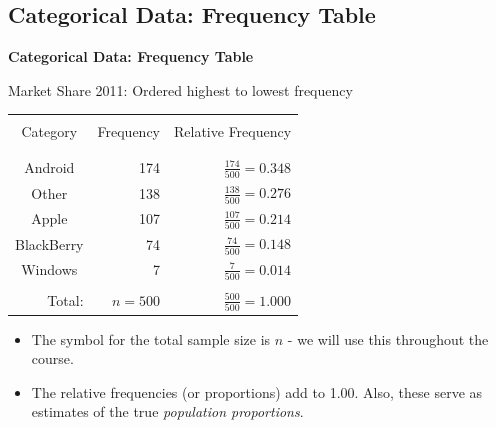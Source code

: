 \documentclass[compress]{beamer}        %
\makeatletter
\newcommand{\tcb}{\textcolor{beamer@blendedblue}}
\makeatother
\begin{document}
\subsection{Categorical Data: Frequency Table}
\begin{frame}{\bf \tcb{Categorical Data: Frequency Table}\\[-1cm]}
\begin{center}
Market Share 2011: Ordered highest to lowest frequency\\[0.1cm]
\begin{tabular}{|c|r|r|}
\hline
&&\\[-0.4cm]
Category   & Frequency & Relative Frequency \\
&&\\[-0.5cm]
\hline
&&\\[-0.4cm]
Android    &   174     & $\tfrac{174}{500} = 0.348$ \\[0.2cm]
Other      &   138     & $\tfrac{138}{500} = 0.276$ \\[0.2cm]
Apple      &   107     & $\tfrac{107}{500} = 0.214$ \\[0.2cm]
BlackBerry &    74     & $\tfrac{74}{500} = 0.148$ \\[0.2cm]
Windows    &     7     & $\tfrac{7}{500} = 0.014$ \\[0.2cm]
\hline
&&\\[-0.4cm]
\multicolumn{1}{|r|}{Total:} & $n = 500$ & $\tfrac{500}{500} = 1.000$ \\[0.1cm]
\hline
\end{tabular}
\end{center}
\begin{itemize}\itemsep0.2cm
\item The symbol for the total sample size is {\boldmath$n$} - we will use this throughout the course.
\item The relative frequencies (or proportions) add to 1.00. Also, these serve as estimates of the true \emph{population proportions}.
\end{itemize}

\end{frame}
\end{document}
